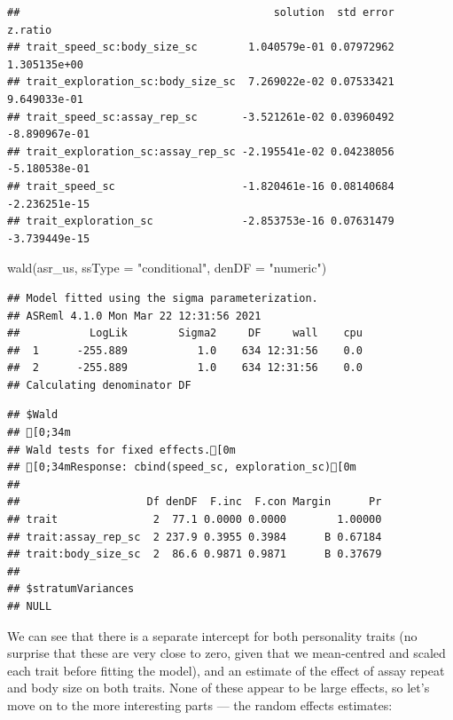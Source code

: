 \documentclass[
  12pt,
]{book}
\newenvironment{Shaded}{\begin{snugshade}}{\end{snugshade}}
\newcommand{\AttributeTok}[1]{\textcolor[rgb]{0.77,0.63,0.00}{#1}}
\newcommand{\ConstantTok}[1]{\textcolor[rgb]{0.00,0.00,0.00}{#1}}
\newcommand{\FunctionTok}[1]{\textcolor[rgb]{0.00,0.00,0.00}{#1}}
\newcommand{\NormalTok}[1]{#1}
\newcommand{\SpecialCharTok}[1]{\textcolor[rgb]{0.00,0.00,0.00}{#1}}
\newcommand{\StringTok}[1]{\textcolor[rgb]{0.31,0.60,0.02}{#1}}
\begin{document}
\begin{Shaded}
\end{Shaded}

\begin{verbatim}
##                                        solution  std error       z.ratio
## trait_speed_sc:body_size_sc        1.040579e-01 0.07972962  1.305135e+00
## trait_exploration_sc:body_size_sc  7.269022e-02 0.07533421  9.649033e-01
## trait_speed_sc:assay_rep_sc       -3.521261e-02 0.03960492 -8.890967e-01
## trait_exploration_sc:assay_rep_sc -2.195541e-02 0.04238056 -5.180538e-01
## trait_speed_sc                    -1.820461e-16 0.08140684 -2.236251e-15
## trait_exploration_sc              -2.853753e-16 0.07631479 -3.739449e-15
\end{verbatim}

\begin{Shaded}
\begin{Highlighting}[]
\FunctionTok{wald}\NormalTok{(asr\_us, }\AttributeTok{ssType =} \StringTok{"conditional"}\NormalTok{, }\AttributeTok{denDF =} \StringTok{"numeric"}\NormalTok{)}
\end{Highlighting}
\end{Shaded}

\begin{verbatim}
## Model fitted using the sigma parameterization.
## ASReml 4.1.0 Mon Mar 22 12:31:56 2021
##           LogLik        Sigma2     DF     wall    cpu
##  1      -255.889           1.0    634 12:31:56    0.0
##  2      -255.889           1.0    634 12:31:56    0.0
## Calculating denominator DF
\end{verbatim}

\begin{verbatim}
## $Wald
## [0;34m
## Wald tests for fixed effects.[0m
## [0;34mResponse: cbind(speed_sc, exploration_sc)[0m
## 
##                    Df denDF  F.inc  F.con Margin      Pr
## trait               2  77.1 0.0000 0.0000        1.00000
## trait:assay_rep_sc  2 237.9 0.3955 0.3984      B 0.67184
## trait:body_size_sc  2  86.6 0.9871 0.9871      B 0.37679
## 
## $stratumVariances
## NULL
\end{verbatim}

We can see that there is a separate intercept for both personality traits (no surprise that these are very close to zero, given that we mean-centred and scaled each trait before fitting the model), and an estimate of the effect of assay repeat and body size on both traits. None of these appear to be large effects, so let's move on to the more interesting parts --- the random effects estimates:
\end{document}
